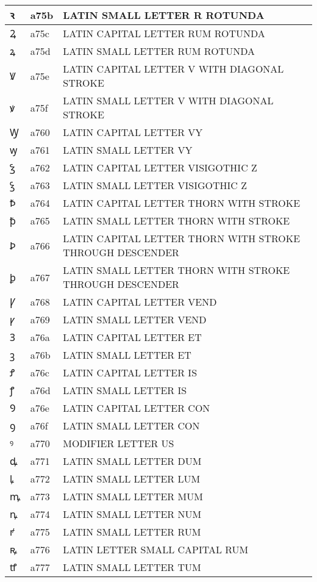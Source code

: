 \documentclass[12pt,letterpaper,openany]{book}
\begin{document}
\begin{center}
\begin{supertabular}{|m{0.25in}|m{0.5in}|m{4in}|}
			ꝛ & a75b & LATIN SMALL LETTER R ROTUNDA\\\hline
			Ꝝ & a75c & LATIN CAPITAL LETTER RUM ROTUNDA\\\hline
			ꝝ & a75d & LATIN SMALL LETTER RUM ROTUNDA\\\hline
			Ꝟ & a75e & LATIN CAPITAL LETTER V WITH DIAGONAL STROKE\\\hline
			ꝟ & a75f & LATIN SMALL LETTER V WITH DIAGONAL STROKE\\\hline
			Ꝡ & a760 & LATIN CAPITAL LETTER VY\\\hline
			ꝡ & a761 & LATIN SMALL LETTER VY\\\hline
			Ꝣ & a762 & LATIN CAPITAL LETTER VISIGOTHIC Z\\\hline
			ꝣ & a763 & LATIN SMALL LETTER VISIGOTHIC Z\\\hline
			Ꝥ & a764 & LATIN CAPITAL LETTER THORN WITH STROKE\\\hline
			ꝥ & a765 & LATIN SMALL LETTER THORN WITH STROKE\\\hline
			Ꝧ & a766 & LATIN CAPITAL LETTER THORN WITH STROKE THROUGH DESCENDER\\\hline
			ꝧ & a767 & LATIN SMALL LETTER THORN WITH STROKE THROUGH DESCENDER\\\hline
			Ꝩ & a768 & LATIN CAPITAL LETTER VEND\\\hline
			ꝩ & a769 & LATIN SMALL LETTER VEND\\\hline
			Ꝫ & a76a & LATIN CAPITAL LETTER ET\\\hline
			ꝫ & a76b & LATIN SMALL LETTER ET\\\hline
			Ꝭ & a76c & LATIN CAPITAL LETTER IS\\\hline
			ꝭ & a76d & LATIN SMALL LETTER IS\\\hline
			Ꝯ & a76e & LATIN CAPITAL LETTER CON\\\hline
			ꝯ & a76f & LATIN SMALL LETTER CON\\\hline
			ꝰ & a770 & MODIFIER LETTER US\\\hline
			ꝱ & a771 & LATIN SMALL LETTER DUM\\\hline
			ꝲ & a772 & LATIN SMALL LETTER LUM\\\hline
			ꝳ & a773 & LATIN SMALL LETTER MUM\\\hline
			ꝴ & a774 & LATIN SMALL LETTER NUM\\\hline
			ꝵ & a775 & LATIN SMALL LETTER RUM\\\hline
			ꝶ & a776 & LATIN LETTER SMALL CAPITAL RUM\\\hline
			ꝷ & a777 & LATIN SMALL LETTER TUM\\\hline

\end{supertabular}
\end{center}
\end{document}
